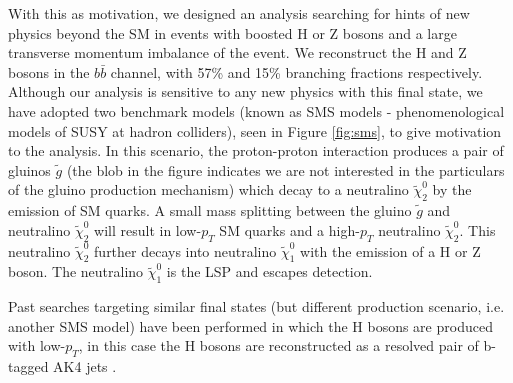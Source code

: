 With this as motivation, we designed an analysis searching for hints of new physics beyond the SM in events with boosted H or Z bosons and a large transverse momentum imbalance of the event. We reconstruct the H and Z bosons in the $b\bar{b}$ channel, with 57\% and 15\% branching fractions respectively. Although our analysis is sensitive to any new physics with this final state, we have adopted two benchmark models (known as SMS models\cite{CMS-SUS-11-016} - phenomenological models of SUSY at hadron colliders), seen in Figure \ref{fig:sms}, to give motivation to the analysis. In this scenario, the proton-proton interaction produces a pair of gluinos $\tilde{g}$ (the blob in the figure indicates we are not interested in the particulars of the gluino production mechanism) which decay to a neutralino $\tilde{\chi}_{2}^{0}$ by the emission of SM quarks. A small mass splitting between the gluino $\tilde{g}$ and neutralino $\tilde{\chi}_{2}^{0}$ will result in low-$p_{T}$ SM quarks and a high-$p_{T}$ neutralino $\tilde{\chi}_{2}^{0}$. This neutralino $\tilde{\chi}_{2}^{0}$ further decays into neutralino $\tilde{\chi}_{1}^{0}$ with the emission of a H or Z boson. The neutralino $\tilde{\chi}_{1}^{0}$ is the LSP and escapes detection. 
 
Past searches targeting similar final states (but different production scenario, i.e. another SMS model) have been performed in which the H bosons are produced with low-$p_{T}$, in this case the H bosons are reconstructed as a resolved pair of b-tagged AK4 jets \cite{CMS-SUS-16-044}.
 
